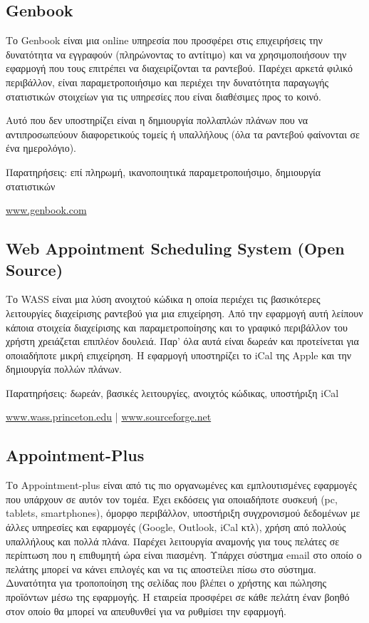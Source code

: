 \subsection{Genbook}
Το Genbook είναι μια online υπηρεσία που προσφέρει στις επιχειρήσεις την δυνατότητα να εγγραφούν (πληρώνοντας το αντίτιμο) και να χρησιμοποιήσουν την εφαρμογή που τους επιτρέπει να διαχειρίζονται τα ραντεβού. Παρέχει αρκετά φιλικό περιβάλλον, είναι παραμετροποιήσιμο και περιέχει την δυνατότητα παραγωγής στατιστικών στοιχείων για τις υπηρεσίες που είναι διαθέσιμες προς το κοινό. 

Αυτό που δεν υποστηρίζει είναι η δημιουργία πολλαπλών πλάνων που να αντιπροσωπεύουν διαφορετικούς τομείς ή υπαλλήλους (όλα τα ραντεβού φαίνονται σε ένα ημερολόγιο).

Παρατηρήσεις: επί πληρωμή, ικανοποιητικά παραμετροποιήσιμο, δημιουργία στατιστικών

\href{http://www.genbook.com}{www.genbook.com}

\subsection{Web Appointment Scheduling System (Open Source)}
Το WASS είναι μια λύση ανοιχτού κώδικα η οποία περιέχει τις βασικότερες λειτουργίες διαχείρισης ραντεβού για μια επιχείρηση. Από την εφαρμογή αυτή λείπουν κάποια στοιχεία διαχείρισης και παραμετροποίησης και το γραφικό περιβάλλον του χρήστη χρειάζεται επιπλέον δουλειά. Παρ' όλα αυτά είναι δωρεάν και προτείνεται για οποιαδήποτε μικρή επιχείρηση. Η εφαρμογή υποστηρίζει το iCal της Apple και την δημιουργία πολλών πλάνων.

Παρατηρήσεις: δωρεάν, βασικές λειτουργίες, ανοιχτός κώδικας, υποστήριξη iCal

\href{https://wass.princeton.edu/pages/login.page.php}{www.wass.princeton.edu} |
\href{http://sourceforge.net/projects/wass/}{www.sourceforge.net}

\subsection{Appointment-Plus}
Το Appointment-plus είναι από τις πιο οργανωμένες και εμπλουτισμένες εφαρμογές που υπάρχουν σε αυτόν τον τομέα. Έχει εκδόσεις για οποιαδήποτε συσκευή (pc, tablets, smartphones), όμορφο περιβάλλον, υποστήριξη συγχρονισμού δεδομένων με άλλες υπηρεσίες και εφαρμογές (Google, Outlook, iCal κτλ), χρήση από πολλούς υπαλλήλους και πολλά πλάνα. Παρέχει λειτουργία αναμονής για τους πελάτες σε περίπτωση που η επιθυμητή ώρα είναι πιασμένη. Υπάρχει σύστημα email στο οποίο ο πελάτης μπορεί να κάνει επιλογές και να τις αποστείλει πίσω στο σύστημα. Δυνατότητα για τροποποίηση της σελίδας που βλέπει ο χρήστης και πώλησης προϊόντων μέσω της εφαρμογής. Η εταιρεία προσφέρει σε κάθε πελάτη έναν βοηθό στον οποίο θα μπορεί να απευθυνθεί για να ρυθμίσει την εφαρμογή. 

